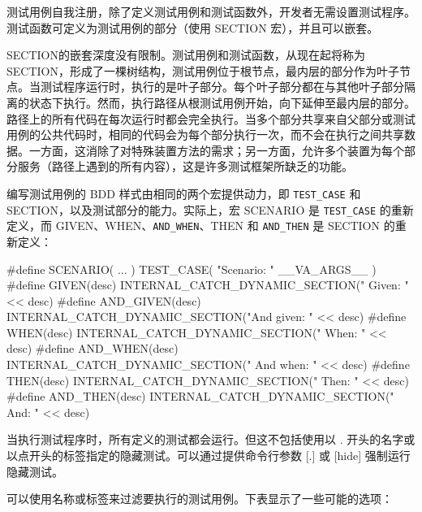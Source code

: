 
测试用例自我注册，除了定义测试用例和测试函数外，开发者无需设置测试程序。测试函数可定义为测试用例的部分（使用 SECTION 宏），并且可以嵌套。

SECTION的嵌套深度没有限制。测试用例和测试函数，从现在起将称为SECTION，形成了一棵树结构，测试用例位于根节点，最内层的部分作为叶子节点。当测试程序运行时，执行的是叶子部分。每个叶子部分都在与其他叶子部分隔离的状态下执行。然而，执行路径从根测试用例开始，向下延伸至最内层的部分。路径上的所有代码在每次运行时都会完全执行。当多个部分共享来自父部分或测试用例的公共代码时，相同的代码会为每个部分执行一次，而不会在执行之间共享数据。一方面，这消除了对特殊装置方法的需求；另一方面，允许多个装置为每个部分服务（路径上遇到的所有内容），这是许多测试框架所缺乏的功能。

编写测试用例的 BDD 样式由相同的两个宏提供动力，即 \verb|TEST_CASE| 和 SECTION，以及测试部分的能力。实际上，宏 SCENARIO 是 \verb|TEST_CASE| 的重新定义，而 GIVEN、WHEN、\verb|AND_WHEN|、THEN 和 \verb|AND_THEN| 是 SECTION 的重新定义：

\begin{cpp}
#define SCENARIO( ... ) TEST_CASE( "Scenario: " __VA_ARGS__ )
#define GIVEN(desc)     INTERNAL_CATCH_DYNAMIC_SECTION("    Given: " << desc)
#define AND_GIVEN(desc) INTERNAL_CATCH_DYNAMIC_SECTION("And given: " << desc)
#define WHEN(desc)      INTERNAL_CATCH_DYNAMIC_SECTION("     When: " << desc)
#define AND_WHEN(desc)  INTERNAL_CATCH_DYNAMIC_SECTION(" And when: " << desc)
#define THEN(desc)      INTERNAL_CATCH_DYNAMIC_SECTION("     Then: " << desc)
#define AND_THEN(desc)  INTERNAL_CATCH_DYNAMIC_SECTION("      And: " << desc)
\end{cpp}

当执行测试程序时，所有定义的测试都会运行。但这不包括使用以 . 开头的名字或以点开头的标签指定的隐藏测试。可以通过提供命令行参数 [.] 或 [hide] 强制运行隐藏测试。

可以使用名称或标签来过滤要执行的测试用例。下表显示了一些可能的选项：

